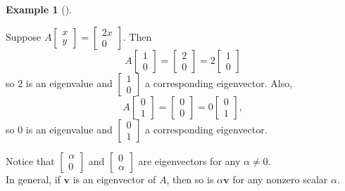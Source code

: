 \documentclass[
  a4paper,
  DIV=11,
  numbers=noendperiod,
  oneside]{scrreprt}
\theoremstyle{definition}
\newtheorem{example}{Example}[chapter]
\theoremstyle{remark}
\begin{document}
\begin{example}[]\protect\hypertarget{exm-}{}\label{exm-}

Suppose
\(A\left[\begin{array}{c} x \\ y \end{array}\right] = \left[\begin{array}{c} 2x \\ 0 \end{array}\right]\).
Then
\[A\left[\begin{array}{c} 1 \\ 0 \end{array}\right] = \left[\begin{array}{c} 2 \\ 0 \end{array}\right] = 2\left[\begin{array}{c} 1 \\ 0 \end{array}\right]\]
so \(2\) is an eigenvalue and
\(\left[\begin{array}{c} 1 \\ 0 \end{array}\right]\) a corresponding
eigenvector. Also,
\[A\left[\begin{array}{c} 0 \\ 1 \end{array}\right] = \left[\begin{array}{c} 0 \\ 0 \end{array}\right] = 0\left[\begin{array}{c} 0 \\ 1 \end{array}\right],\]
so \(0\) is an eigenvalue and
\(\left[\begin{array}{c} 0 \\ 1 \end{array}\right]\) a corresponding
eigenvector.

\end{example}

Notice that \(\left[\begin{array}{c} \alpha \\ 0 \end{array}\right]\)
and \(\left[\begin{array}{c} 0 \\ \alpha \end{array}\right]\) are
eigenvectors for any \(\alpha \neq 0\).\\
In general, if \(\mathbf{v}\) is an eigenvector of \(A\), then so is
\(\alpha \mathbf{v}\) for any nonzero scalar \(\alpha\).
\end{document}
